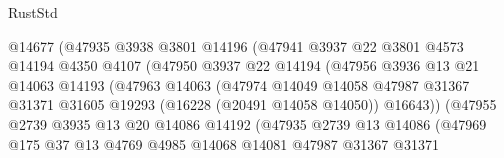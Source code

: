 \begin{lexlean}{RustStd}
\begin{coremodule}
                              @14677
                              (@47935
                                @3938
                                @3801
                                @14196
                                (@47941
                                  @3937
                                  @22
                                  @3801
                                  @4573
                                  @14194
                                  @4350
                                  @4107
                                  (@47950
                                    @3937
                                    @22
                                    @14194
                                    (@47956
                                      @3936
                                      @13
                                      @21
                                      @14063
                                      @14193
                                      (@47963
                                        @14063
                                        (@47974
                                          @14049
                                          @14058
                                          @47987
                                          @31367
                                          @31371
                                          @31605
                                          @19293
                                          (@16228 (@20491 @14058 @14050))
                                          @16643))
                                      (@47955
                                        @2739
                                        @3935
                                        @13
                                        @20
                                        @14086
                                        @14192
                                        (@47935
                                          @2739
                                          @13
                                          @14086
                                          (@47969
                                            @175
                                            @37
                                            @13
                                            @4769
                                            @4985
                                            @14068
                                            @14081
                                            @47987
                                            @31367
                                            @31371

\end{coremodule}
\end{lexlean}
